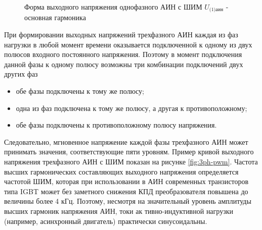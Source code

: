         \begin{figure}[h!]
            \caption{Форма выходного напряжения однофазного АИН с ШИМ
                $U_\text{(1)аин}$ - основная гармоника}
            \label{fig:pwm}
        \end{figure}
        
        При формировании выходных напряжений трехфазного АИН каждая из фаз
        нагрузки в любой момент времени оказывается подключенной к одному из
        двух полюсов входного постоянного напряжения. Поэтому в момент
        подключения данной фазы к одному полюсу возможны три комбинации
        подключений двух других фаз
        \begin{itemize}
            \item обе фазы подключены к тому же полюсу;
            \item одна из фаз подключена к тому же полюсу, а другая к противоположному;
            \item обе фазы подключены к противоположному полюсу напряжения. 
        \end{itemize}

        Следовательно, мгновенное напряжение каждой фазы трехфазного АИН может
        принимать значения, соответствующие пяти уровням. Пример кривой
        выходного напряжения трехфазного АИН с ШИМ показан на рисунке
        \ref{fig:3ph-pwm}. Частота высших гармонических составляющих выходного
        напряжения определяется частотой ШИМ, которая при использовании в АИН
        современных транзисторов типа IGBT может без заметного снижения КПД
        преобразователя повышена до величины более 4 кГц. Поэтому, несмотря на
        значительный уровень амплитуды высших гармоник напряжения АИН, токи ак
        тивно-индуктивной нагрузки (например, асинхронный двигатель)
        практически синусоидальны.

